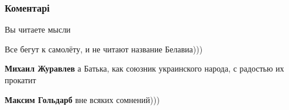  
 
 
 
 
\subsubsection{Коментарі}

\begin{itemize}
 
Вы читаете мысли

 
Все бегут к самолёту, и не читают название Белавиа)))

\begin{itemize}
 
\textbf{Михаил Журавлев} а Батька, как союзник украинского народа, с радостью их прокатит

 
\textbf{Максим Гольдарб} вне всяких сомнений)))

 

\end{itemize}
\end{itemize}
